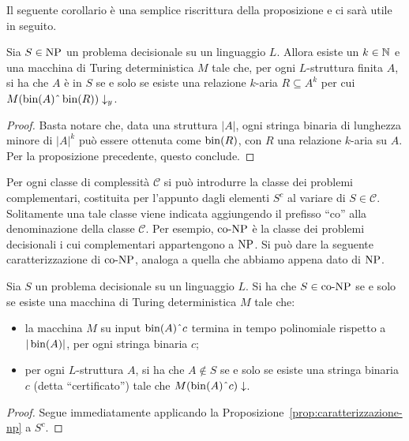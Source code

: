 Il seguente corollario è una semplice riscrittura della proposizione e ci sarà
utile in seguito.

\begin{corollario}
\label{cor:caratterizzazione-np}
  Sia $S \in \operatorname{NP}$ un problema decisionale su un linguaggio $L$. Allora esiste un $k \in \mathbb{N}$ 
  e una macchina di Turing deterministica $M$ tale che, per ogni $L$-struttura finita
  $A$, si ha che $A$ è in $S$ se e solo se esiste una relazione $k$-aria $R \subseteq A^k$
  per cui $M(\bin(A)\string^\bin(R))\downarrow_y$.
\end{corollario}
\begin{proof}
 Basta notare che, data una struttura $|A|$, ogni stringa binaria di lunghezza
 minore di $|A|^k$ può
 essere ottenuta come $\operatorname{bin}(R)$, con $R$ una relazione $k$-aria su $A$.
 Per la proposizione precedente, questo conclude.
\end{proof}



Per ogni classe di complessità $\mathcal{C}$ si può introdurre la classe dei problemi complementari, costituita per l'appunto dagli elementi $S^c$ al variare di $S\in\mathcal{C}$.
Solitamente una tale classe viene indicata aggiungendo il prefisso ``co'' alla denominazione della classe $\mathcal{C}$.
Per esempio, $\operatorname{co-NP}$ è la classe dei problemi decisionali i cui complementari appartengono a $\operatorname{NP}$.
Si può dare la seguente caratterizzazione di $\operatorname{co-NP}$, analoga a quella che abbiamo appena dato di $\operatorname{NP}$.

\begin{proposizione}
  \label{prop:caratterizzazione-conp}
  Sia $S$ un problema decisionale su un linguaggio $L$.
  Si ha che $S \in \operatorname{co-NP}$ se e solo se esiste una macchina di Turing deterministica $M$ tale che:
  \begin{itemize}
    \item la macchina $M$ su input $\bin(A)\string^ c$ termina in tempo polinomiale rispetto a $|\operatorname{bin}(A)|$, per ogni stringa binaria $c$;
    \item per ogni $L$-struttura $A$, si ha che $A\not\in S$ se e solo se esiste una stringa binaria $c$ (detta ``certificato'') tale che $M(\bin(A)\string^ c)\downarrow$.
  \end{itemize}
\end{proposizione}

\begin{proof}
  Segue immediatamente applicando la Proposizione~\ref{prop:caratterizzazione-np} a $S^c$.
\end{proof}


